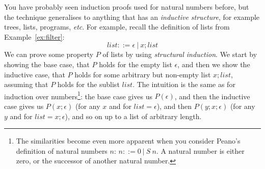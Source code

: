 \documentclass{tufte-handout}
\newcounter{example}
\newcommand{\RED}[1]{\textcolor{red}{#1}}
\begin{document}
You have probably seen induction proofs used for natural numbers
before, but the technique generalises to anything that has an
\emph{inductive structure}, for example trees, lists, programs,
\emph{etc}.%
For example, recall the definition of lists from
Example~\ref{ex:filter}:
\[
  \mathit{list} ::= \epsilon ~|~ x; \mathit{list}
\]
We can prove some property $P$ of lists by using \emph{structural
  induction}. We start by showing the base case, that $P$ holds
for the empty list $\epsilon$, and then we show the inductive
case, that $P$ holds for some arbitrary but non-empty list
$x;\mathit{list}$, assuming that $P$ holds for the sublist
$\mathit{list}$.
%
The intuition is the same as for induction over
numbers\footnote{The similarities become even more apparent when
  you consider Peano's definition of natural numbers $n$:
  $n ::= 0 ~|~ S~n$. A natural number is either zero, or the
  successor of another natural number. }: the base case gives us
$P(\epsilon)$, and then the inductive case gives us
$P(x;\epsilon)$ (for any $x$ and for $\mathit{list} = \epsilon$),
and then $P(y;x;\epsilon)$ (for any $y$ and for
$\mathit{list} = x;\epsilon$), and so on up to a list of arbitrary
length.
\end{document}

